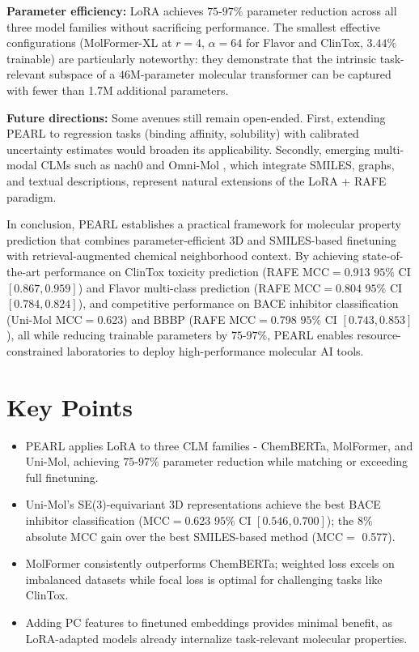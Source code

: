 \documentclass[pdflatex,sn-mathphys-num]{sn-jnl}%
\theoremstyle{thmstyleone}%
\theoremstyle{thmstyletwo}%
\theoremstyle{thmstylethree}%
\begin{document}
\textbf{Parameter efficiency:}
LoRA achieves $75$-$97\%$ parameter reduction across all three model families without sacrificing performance. The smallest effective configurations (MolFormer-XL at $r = 4$, $\alpha = 64$ for Flavor and ClinTox, $3.44\%$ trainable) are particularly noteworthy: they demonstrate that the intrinsic task-relevant subspace of a $46$M-parameter molecular transformer can be captured with fewer than 1.7M additional parameters.

\textbf{Future directions:}
Some avenues still remain open-ended. First, extending PEARL to regression tasks (binding affinity, solubility) with calibrated uncertainty estimates would broaden its applicability. Secondly, emerging multi-modal CLMs such as nach0 \cite{livne2024nach0} and Omni-Mol \cite{hu2025omnimol}, which integrate SMILES, graphs, and textual descriptions, represent natural extensions of the LoRA + RAFE paradigm. 

In conclusion, PEARL establishes a practical framework for molecular property prediction that combines parameter-efficient 3D and SMILES-based finetuning with retrieval-augmented chemical neighborhood context. By achieving state-of-the-art performance on ClinTox toxicity prediction (RAFE MCC$=$0.913 $95\%$ CI $[0.867, 0.959]$) and Flavor multi-class prediction (RAFE MCC$=$0.804 $95\%$ CI $[0.784, 0.824]$), and competitive performance on BACE inhibitor classification (Uni-Mol MCC$=$0.623) and BBBP (RAFE MCC$=$0.798 $95\%$ CI $[0.743, 0.853]$), all while reducing trainable parameters by $75$-$97\%$, PEARL enables resource-constrained laboratories to deploy high-performance molecular AI tools.

\section*{Key Points}
\begin{itemize}
  \item PEARL applies LoRA to three CLM families - ChemBERTa, MolFormer, and Uni-Mol, achieving $75$-$97\%$ parameter reduction while matching or exceeding full finetuning.
  \item Uni-Mol's SE(3)-equivariant 3D representations achieve the best BACE inhibitor classification (MCC$=$0.623 $95\%$ CI $[0.546, 0.700]$); the 8\% absolute MCC gain over the best SMILES-based method (MCC$=$ 0.577).
  \item MolFormer consistently outperforms ChemBERTa; weighted loss excels on imbalanced datasets while focal loss is optimal for challenging tasks like ClinTox.
  \item Adding PC features to finetuned embeddings provides minimal benefit, as LoRA-adapted models already internalize task-relevant molecular properties.
\end{itemize}
\end{document}
